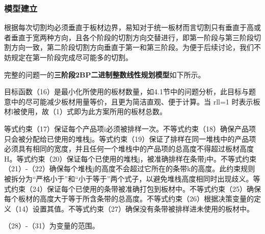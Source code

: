 \documentclass[bwprint]{gmcmthesis}
\begin{document}
\subsubsection{模型建立}
根据每次切割均必须垂直于板材边界，易知对于统一板材而言切割只有垂直于高或者垂直于宽两种方向，且各个阶段的切割方向交替进行，即第一阶段与第三阶段切割方向一致，第二阶段切割方向垂直于第一和第三阶段。为便于后续讨论，我们不妨规定在第一阶段完成尽可能多的切割。

完整的问题一的\textbf{三阶段2BP二进制整数线性规划模型}如下所示。


目标函数（16）是最小化所使用的板材数量，如4.1节中的问题分析，此目标与题意中的尽可能减少板材用量等价，且更为简洁直观、便于计算。当 rll=1 时表示板材l被使用，故（1）式即为此方案所用的板材总数。

等式约束（17）保证每个产品项i必须被排样一次。不等式约束（18）确保产品项只会被分配给已使用的堆栈j。等式约束（19）保证了排样在同一堆栈中的产品项必须具有相同的宽度，并且任何一个堆栈中的产品项的总高度不得超过板材高度H。等式约束（20）保证每个已使用的堆栈j，被准确排样在条带j中。不等式约束（21）-（22）确保每个堆栈j的高度不会超过它所在的条带k的高度。此约束规则被拆分为“严格小于”和“小于等于”两个式子，以避免堆栈高度相同时出现歧义。等式约束（24）保证每个已使用的条带被准确打包到板材中。不等式约束（25）确保每个板材的高度大于等于所含条带的总高度。不等式约束（26）根据决策变量的定义（14）设置其值。不等式约束（27）确保没有条带被排样进未使用的板材中。

（28）-（31）为变量的范围。
\end{document}

